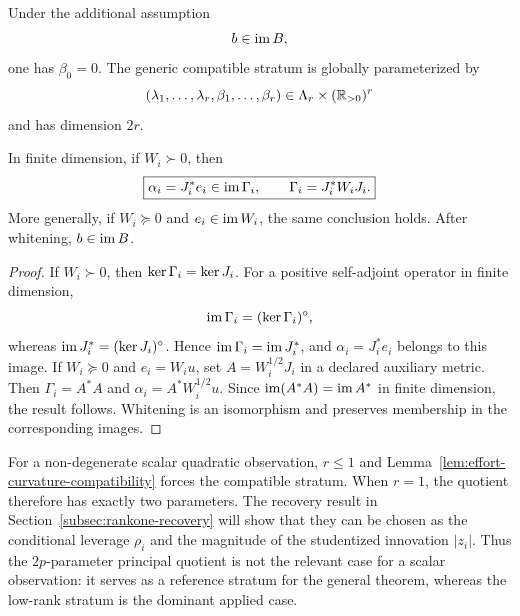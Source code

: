 \begin{corollary}
Under the additional assumption
\[
b\in\operatorname{im} B,
\]
one has $\beta_0=0$. The generic compatible stratum is globally parameterized by
\[
(\lambda_1,\ldots,\lambda_r,
 \beta_1,\ldots,\beta_r)
\in\Lambda_r\times(\mathbb{R}_{>0})^r
\]
and has dimension $2r$.
\label{cor:compatible-stratum}
\end{corollary}

\begin{lemma}
In finite dimension, if $W_i\succ0$, then
\begin{equation}
\boxed{
\alpha_i=J_i^*e_i\in\operatorname{im}\Gamma_i,
\qquad
\Gamma_i=J_i^*W_iJ_i.
}
\label{eq:compatibility-lemma}
\end{equation}
More generally, if $W_i\succeq0$ and $e_i\in\operatorname{im} W_i$, the same conclusion holds. After whitening, $b\in\operatorname{im} B$.
\label{lem:effort-curvature-compatibility}
\end{lemma}

\begin{proof}
If $W_i\succ0$, then $\operatorname{ker}\Gamma_i=\operatorname{ker} J_i$. For a positive self-adjoint operator in finite dimension,
\[
\operatorname{im}\Gamma_i=(\operatorname{ker}\Gamma_i)^\circ,
\]
whereas $\operatorname{im} J_i^*=(\operatorname{ker} J_i)^\circ$. Hence $\operatorname{im}\Gamma_i=\operatorname{im} J_i^*$, and $\alpha_i=J_i^*e_i$ belongs to this image. If $W_i\succeq0$ and $e_i=W_iu$, set $A=W_i^{1/2}J_i$ in a declared auxiliary metric. Then $\Gamma_i=A^*A$ and $\alpha_i=A^*W_i^{1/2}u$. Since $\operatorname{im}(A^*A)=\operatorname{im} A^*$ in finite dimension, the result follows. Whitening is an isomorphism and preserves membership in the corresponding images.
\end{proof}

\begin{remark}
For a non-degenerate scalar quadratic observation, $r\leq1$ and Lemma~\ref{lem:effort-curvature-compatibility} forces the compatible stratum. When $r=1$, the quotient therefore has exactly two parameters. The recovery result in Section~\ref{subsec:rankone-recovery} will show that they can be chosen as the conditional leverage $\rho_i$ and the magnitude of the studentized innovation $|z_i|$. Thus the $2p$-parameter principal quotient is not the relevant case for a scalar observation: it serves as a reference stratum for the general theorem, whereas the low-rank stratum is the dominant applied case.
\end{remark}

